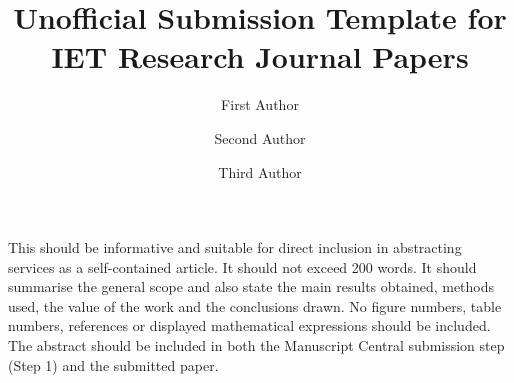 \documentclass{ietperso}
\begin{document}
\title{Unofficial Submission Template for IET Research Journal Papers}
\author[1]{First Author}
\author[2,*]{Second Author}
\author[3,4]{Third Author}

\maketitle

\begin{ietabstract}
This should be informative and suitable for direct inclusion in abstracting services as a self-contained article. It should not exceed 200 words. It should summarise the general scope and also state the main results obtained, methods used, the value of the work and the conclusions drawn. No figure numbers, table numbers, references or displayed mathematical expressions should be included. The abstract should be included in both the Manuscript Central submission step (Step 1) and the submitted paper.
\end{ietabstract}
\end{document}
